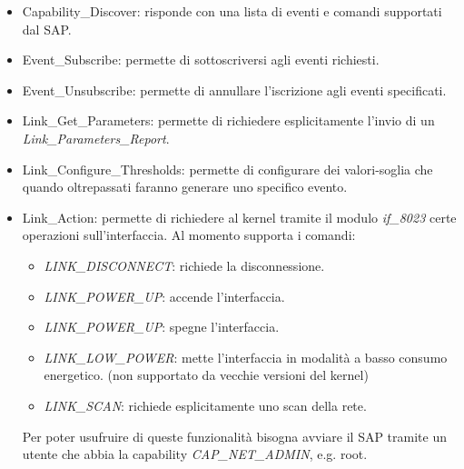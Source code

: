 \begin{itemize}
\item Capability\_Discover: risponde con una lista di eventi e comandi supportati dal SAP.
\item Event\_Subscribe: permette di sottoscriversi agli eventi richiesti.
\item Event\_Unsubscribe: permette di annullare l'iscrizione agli eventi specificati.
\item Link\_Get\_Parameters: permette di richiedere esplicitamente l'invio di un {\em Link\_Parameters\_Report}.
\item Link\_Configure\_Thresholds: permette di configurare dei valori-soglia che quando oltrepassati faranno generare uno specifico evento.
\item Link\_Action: permette di richiedere al kernel tramite il modulo {\em if\_8023} certe operazioni sull'interfaccia. Al momento supporta i comandi:

\begin{itemize}
\item {\em LINK\_DISCONNECT}: richiede la disconnessione.

\item {\em LINK\_POWER\_UP}: accende l'interfaccia.

\item {\em LINK\_POWER\_UP}: spegne l'interfaccia.

\item {\em LINK\_LOW\_POWER}: mette l'interfaccia in modalità a basso consumo energetico. (non supportato da vecchie versioni del kernel)

\item {\em LINK\_SCAN}: richiede esplicitamente uno scan della rete.

\end{itemize}
Per poter usufruire di queste funzionalità bisogna avviare il SAP tramite un utente che abbia la capability {\em CAP\_NET\_ADMIN}, e.g. root.
\end{itemize}

